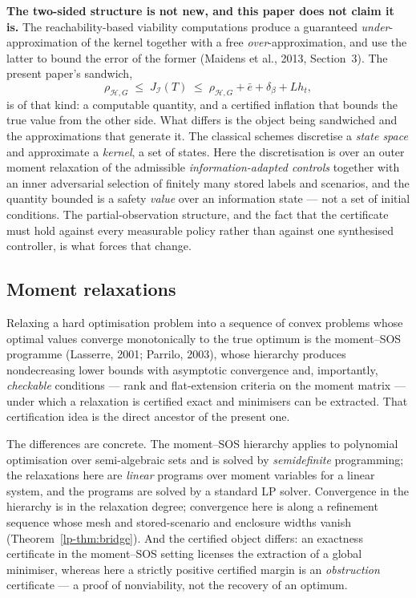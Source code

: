 \documentclass[10pt,twocolumn]{article}
\theoremstyle{plain}
\theoremstyle{definition}
\theoremstyle{remark}
\begin{document}
\textbf{The two-sided structure is not new, and this paper does not claim it is.} The
reachability-based viability computations produce a guaranteed \emph{under}-approximation of
the kernel together with a free \emph{over}-approximation, and use the latter to bound the
error of the former (Maidens et al., 2013, Section~3). The present paper's sandwich,
\[
\rho_{\mathcal{H},G}\;\le\;J_{\mathcal{I}}(T)\;\le\;\rho_{\mathcal{H},G}+\bar{e}+\delta_{\beta}+L h_{t},
\]
is of that kind: a computable quantity, and a certified inflation that bounds the true value
from the other side. What differs is the object being sandwiched and the approximations that
generate it. The classical schemes discretise a \emph{state space} and approximate a
\emph{kernel}, a set of states. Here the discretisation is over an outer moment relaxation of
the admissible \emph{information-adapted controls} together with an inner adversarial
selection of finitely many stored labels and scenarios, and the quantity bounded is a
safety \emph{value} over an information state — not a set of initial conditions. The
partial-observation structure, and the fact that the certificate must hold against every
measurable policy rather than against one synthesised controller, is what forces that
change.

\subsection{Moment relaxations}

Relaxing a hard optimisation problem into a sequence of convex problems whose optimal values
converge monotonically to the true optimum is the moment--SOS programme (Lasserre, 2001;
Parrilo, 2003), whose hierarchy produces nondecreasing lower bounds with asymptotic
convergence and, importantly, \emph{checkable} conditions — rank and flat-extension criteria
on the moment matrix — under which a relaxation is certified exact and minimisers can be
extracted. That certification idea is the direct ancestor of the present one.

The differences are concrete. The moment--SOS hierarchy applies to polynomial optimisation
over semi-algebraic sets and is solved by \emph{semidefinite} programming; the relaxations
here are \emph{linear} programs over moment variables for a linear system, and the programs
are solved by a standard LP solver. Convergence in the hierarchy is in the relaxation
degree; convergence here is along a refinement sequence whose mesh and stored-scenario and
enclosure widths vanish (Theorem~\ref{lp-thm:bridge}). And the certified object differs: an
exactness certificate in the moment--SOS setting licenses the extraction of a global
minimiser, whereas here a strictly positive certified margin is an \emph{obstruction}
certificate — a proof of nonviability, not the recovery of an optimum.
\end{document}
